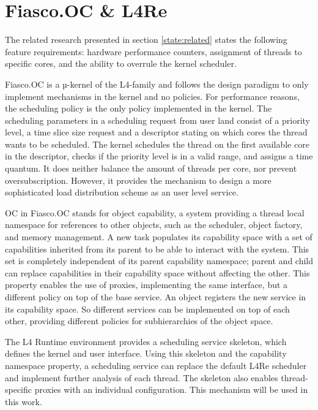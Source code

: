 \section{Fiasco.OC \& L4Re}
\label{state:env}
The related research presented in section \ref{state:related} states the
following feature requirements:
hardware performance counters, assignment of threads to specific
cores, and the ability to overrule the kernel scheduler.

Fiasco.OC is a µ-kernel of the L4-family and follows the design paradigm to
only implement mechanisms in the kernel and no policies.
For performance reasons, the scheduling policy is the only policy implemented in
the kernel.
The scheduling parameters in a scheduling request from user land consist of
a priority level, a time slice size request and a descriptor stating on which
cores the thread wants to be scheduled.
The kernel schedules the thread on the first available core in the descriptor,
checks if the priority level is in a valid range, and assigns a time
quantum.
It does neither balance the amount of threads per core, nor prevent
oversubscription.
However, it provides the mechanism to design a more sophisticated load
distribution scheme as an user level service.

OC in Fiasco.OC stands for object capability, a system providing a thread local
namespace for references to other objects, such as the scheduler, object
factory, and memory management.
A new task populates its capability space with a set of capabilities inherited
from its parent to be able to interact with the system.
This set is completely independent of its parent capability namespace; parent
and child can replace capabilities in their capability space without affecting
the other.
This property enables the use of proxies, implementing the same interface, but
a different policy on top of the base service.
An object registers the new service in its capability space.
So different services can be implemented on top of each other, providing
different policies for subhierarchies of the object space.


The L4 Runtime environment provides a scheduling service skeleton, which
defines the kernel and user interface.
Using this skeleton and the capability namespace property, a scheduling service
can replace the default L4Re scheduler and implement further analysis of each
thread.
The skeleton also enables thread-specific proxies with an individual
configuration.
This mechanism will be used in this work.
\\

